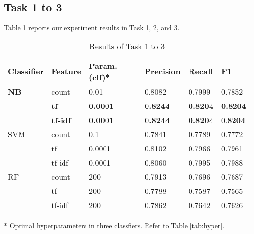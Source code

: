 \documentclass[12pt]{article}
\begin{document}
\subsection{Task 1 to 3}
Table \ref{tab:1to3} reports our experiment results in Task 1, 2, and 3.
\begin{table}[h]
\centering
\caption{Results of Task 1 to 3}
\label{tab:1to3}
\begin{threeparttable}
\begin{tabular}{llllll}
\toprule
\textbf{Classifier} & \textbf{Feature} & \textbf{Param.(clf)}* &  \textbf{Precision} & \textbf{Recall} & \textbf{F1}\\
\midrule
\textbf{NB} & count & 0.01 & 0.8082 & 0.7999 & 0.7852\\
            & \textbf{tf} & \textbf{0.0001} & \textbf{0.8244} & \textbf{0.8204} & \textbf{0.8204}\\
            & \textbf{tf-idf} & \textbf{0.0001} & \textbf{0.8244} & \textbf{0.8204} & 0.\textbf{8204}\\
SVM & count & 0.1 & 0.7841 & 0.7789 & 0.7772 \\
& tf & 0.0001 & 0.8102 & 0.7966 & 0.7961 \\
& tf-idf & 0.0001 & 0.8060 & 0.7995 & 0.7988\\
RF & count & 200 & 0.7913 & 0.7696 & 0.7687\\
& tf & 200 & 0.7788 & 0.7587 & 0.7565 \\
& tf-idf & 200 & 0.7862 & 0.7642 & 0.7626\\
\bottomrule
\end{tabular}
\begin{tablenotes}
    \footnotesize
    \item[*] Optimal hyperparameters in three classfiers. Refer to Table \ref{tab:hyper}.
\end{tablenotes}
\end{threeparttable}
\end{table}
\end{document}
